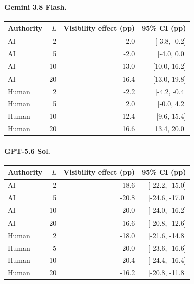 \paragraph{Gemini 3.8 Flash.}
\begin{center}
\small
\begin{tabular}{lrrr}
\toprule
Authority & $L$ & Visibility effect (pp) & 95\% CI (pp) \\
\midrule
AI & 2 & -2.0 & [-3.8, -0.2] \\
AI & 5 & -2.0 & [-4.0, 0.0] \\
AI & 10 & 13.0 & [10.0, 16.2] \\
AI & 20 & 16.4 & [13.0, 19.8] \\
Human & 2 & -2.2 & [-4.2, -0.4] \\
Human & 5 & 2.0 & [-0.0, 4.2] \\
Human & 10 & 12.4 & [9.6, 15.4] \\
Human & 20 & 16.6 & [13.4, 20.0] \\
\bottomrule
\end{tabular}
\end{center}

\paragraph{GPT-5.6 Sol.}
\begin{center}
\small
\begin{tabular}{lrrr}
\toprule
Authority & $L$ & Visibility effect (pp) & 95\% CI (pp) \\
\midrule
AI & 2 & -18.6 & [-22.2, -15.0] \\
AI & 5 & -20.8 & [-24.6, -17.0] \\
AI & 10 & -20.0 & [-24.0, -16.2] \\
AI & 20 & -16.6 & [-20.8, -12.6] \\
Human & 2 & -18.0 & [-21.6, -14.8] \\
Human & 5 & -20.0 & [-23.6, -16.6] \\
Human & 10 & -20.4 & [-24.4, -16.4] \\
Human & 20 & -16.2 & [-20.8, -11.8] \\
\bottomrule
\end{tabular}
\end{center}

